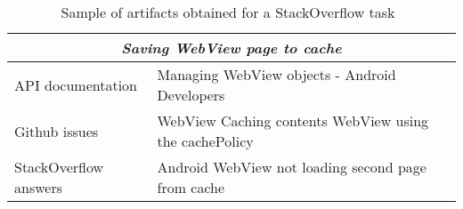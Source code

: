 \begin{table}[H]
\centering    
\begin{scriptsize}
\begin{threeparttable}
\begin{tabular}{l|l}

\hline

\multicolumn{2}{c}{\textit{Saving WebView page to cache}}  \\

\hline
\hline

\multirow{1}{*}{API documentation}
& Managing WebView objects - Android Developers \\

\multirow{1}{*}{Github issues}
& WebView Caching contents WebView using the cachePolicy \\


\multirow{1}{*}{StackOverflow answers}
& Android WebView not loading second page from cache \\
\hline

\end{tabular}
\end{threeparttable}
\end{scriptsize}
\caption{Sample of artifacts obtained for a StackOverflow task~\cite{so18607655}}
\label{tbl:googlesearch-example-so}
\end{table}



